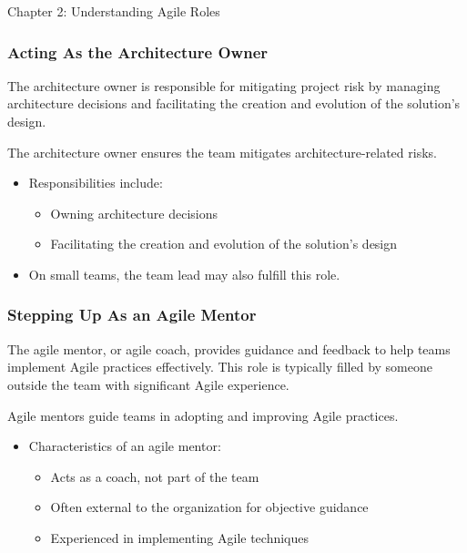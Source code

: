 \begin{notes}{Chapter 2: Understanding Agile Roles}
\begin{highlight}
    \end{highlight}
    
    \subsubsection*{Acting As the Architecture Owner}
    
    The architecture owner is responsible for mitigating project risk by managing architecture decisions and facilitating the creation and evolution of the solution's design.
    
    \begin{highlight}
    
        The architecture owner ensures the team mitigates architecture-related risks.
        
        \begin{itemize}
            \item Responsibilities include:
            \begin{itemize}
                \item Owning architecture decisions
                \item Facilitating the creation and evolution of the solution's design
            \end{itemize}
            \item On small teams, the team lead may also fulfill this role.
        \end{itemize}
    
    \end{highlight}
    
    \subsubsection*{Stepping Up As an Agile Mentor}
    
    The agile mentor, or agile coach, provides guidance and feedback to help teams implement Agile practices effectively. This role is typically filled by someone outside the team with significant 
    Agile experience.
    
    \begin{highlight}
    
        Agile mentors guide teams in adopting and improving Agile practices.
        
        \begin{itemize}
            \item Characteristics of an agile mentor:
            \begin{itemize}
                \item Acts as a coach, not part of the team
                \item Often external to the organization for objective guidance
                \item Experienced in implementing Agile techniques
            \end{itemize}
        \end{itemize}
    

\end{highlight}
\end{notes}
